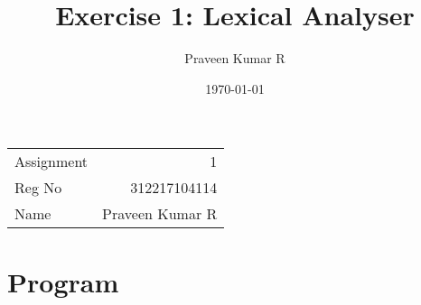 \documentclass[11pt]{article}
\author{Praveen Kumar R}
\date{\today}
\title{Exercise 1: Lexical Analyser}
\begin{document}
\maketitle
\begin{export}
\linespread{1.2}
\end{export}
\begin{center}
\begin{tabular}{lr}
Assignment & 1\\
Reg No & 312217104114\\
Name & Praveen Kumar R\\
\end{tabular}
\end{center}


\section{Program}
\label{sec-1}
\end{document}
